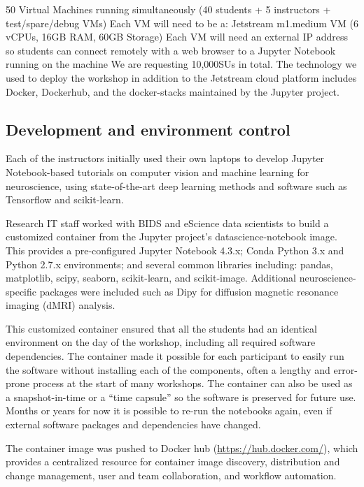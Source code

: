 50 Virtual Machines running simultaneously (40 students + 5 instructors +
test/spare/debug VMs) Each VM will need to be a: Jetstream m1.medium VM (6
vCPUs, 16GB RAM, 60GB Storage) Each VM will need an external IP address so
students can connect remotely with a web browser to a Jupyter Notebook running
on the machine We are requesting 10,000SUs in total.  The technology we used to
deploy the workshop in addition to the Jetstream cloud platform includes Docker,
Dockerhub, and the docker-stacks maintained by the Jupyter project.

\subsection{Development and environment control}

Each of the instructors initially used their own laptops to develop Jupyter
Notebook-based tutorials on computer vision and machine learning for
neuroscience, using state-of-the-art deep learning methods and software such as
Tensorflow and scikit-learn.

Research IT staff worked with BIDS and eScience data scientists to build a
customized container from the Jupyter project’s datascience-notebook image. This
provides a pre-configured Jupyter Notebook 4.3.x; Conda Python 3.x and Python
2.7.x environments; and several common libraries including: pandas, matplotlib,
scipy, seaborn, scikit-learn, and scikit-image. Additional neuroscience-specific
packages were included such as Dipy for diffusion magnetic resonance imaging
(dMRI) analysis.

This customized container ensured that all the students had an identical
environment on the day of the workshop, including all required software
dependencies. The container made it possible for each participant to easily run
the software without installing each of the components, often a lengthy and
error-prone process at the start of many workshops. The container can also be
used as a snapshot-in-time or a “time capsule” so the software is preserved for
future use. Months or years for now it is possible to re-run the notebooks
again, even if external software packages and dependencies have changed.

The container image was pushed to Docker hub (\url{https://hub.docker.com/}),
which provides a centralized resource for container image discovery,
distribution and change management, user and team collaboration, and workflow
automation.

